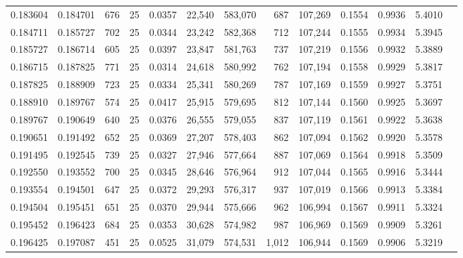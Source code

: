 \begin{tabular}{rrrrrrrrrrrrr}
0.183604 & 0.184701 &   676 &  25 &                                     0.0357 &  22,540 & 583,070 &     687 & 107,269 & 0.1554 & 0.9936 & 5.4010 \\
0.184711 & 0.185727 &   702 &  25 &                                     0.0344 &  23,242 & 582,368 &     712 & 107,244 & 0.1555 & 0.9934 & 5.3945 \\
0.185727 & 0.186714 &   605 &  25 &                                     0.0397 &  23,847 & 581,763 &     737 & 107,219 & 0.1556 & 0.9932 & 5.3889 \\
0.186715 & 0.187825 &   771 &  25 &                                     0.0314 &  24,618 & 580,992 &     762 & 107,194 & 0.1558 & 0.9929 & 5.3817 \\
0.187825 & 0.188909 &   723 &  25 &                                     0.0334 &  25,341 & 580,269 &     787 & 107,169 & 0.1559 & 0.9927 & 5.3751 \\
0.188910 & 0.189767 &   574 &  25 &                                     0.0417 &  25,915 & 579,695 &     812 & 107,144 & 0.1560 & 0.9925 & 5.3697 \\
0.189767 & 0.190649 &   640 &  25 &                                     0.0376 &  26,555 & 579,055 &     837 & 107,119 & 0.1561 & 0.9922 & 5.3638 \\
0.190651 & 0.191492 &   652 &  25 &                                     0.0369 &  27,207 & 578,403 &     862 & 107,094 & 0.1562 & 0.9920 & 5.3578 \\
0.191495 & 0.192545 &   739 &  25 &                                     0.0327 &  27,946 & 577,664 &     887 & 107,069 & 0.1564 & 0.9918 & 5.3509 \\
0.192550 & 0.193552 &   700 &  25 &                                     0.0345 &  28,646 & 576,964 &     912 & 107,044 & 0.1565 & 0.9916 & 5.3444 \\
0.193554 & 0.194501 &   647 &  25 &                                     0.0372 &  29,293 & 576,317 &     937 & 107,019 & 0.1566 & 0.9913 & 5.3384 \\
0.194504 & 0.195451 &   651 &  25 &                                     0.0370 &  29,944 & 575,666 &     962 & 106,994 & 0.1567 & 0.9911 & 5.3324 \\
0.195452 & 0.196423 &   684 &  25 &                                     0.0353 &  30,628 & 574,982 &     987 & 106,969 & 0.1569 & 0.9909 & 5.3261 \\
0.196425 & 0.197087 &   451 &  25 &                                     0.0525 &  31,079 & 574,531 &   1,012 & 106,944 & 0.1569 & 0.9906 & 5.3219 \\

\end{tabular}
